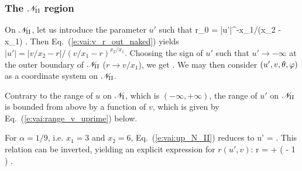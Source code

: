 \subsubsection{The $\mathscr{N}_{\rm II}$ region}

On $\mathscr{N}_{\rm II}$, let us introduce the parameter $u'$ such that
\be \label{e:vai:def_up_tilde_c}
    r_0 = |u'|^{-x_1/(x_2 - x_1)} .
\ee
Then Eq.~(\ref{e:vai:v_r_out_naked}) yields $|u'| = |v/x_2 - r| / (v/x_1 - r)^{x_2/x_1}$.
Choosing the sign of $u'$ such that $u'\to -\infty$ at the outer boundary of
$\mathscr{N}_{\rm II}$ ($r\to v/x_1$), we get
\be \label{e:vai:up_N_II}
    .
\ee
We may then consider $(u',v,\theta,\varphi)$ as a coordinate system on $\mathscr{N}_{\rm II}$.

\begin{remark}
Contrary to the range of $u$ on $\mathscr{N}_{\rm I}$, which is $(-\infty,+\infty)$,
the range of $u'$ on $\mathscr{N}_{\rm II}$ is bounded from above by a function
of $v$, which is given by Eq.~(\ref{e:vai:range_v_uprime}) below.
\end{remark}

\begin{example}
For $\alpha=1/9$, i.e. $x_1 = 3$ and $x_2 = 6$,
Eq.~(\ref{e:vai:up_N_II}) reduces to
\be \label{e:vai:up_v_r_alp1o9}
    u' =  .
\ee
This relation can be inverted, yielding  an explicit expression for $r(u', v)$:
\be \label{e:vai:r_up_v_alp1o9}
    r =  +  \left(  - 1 \right) .
\ee
\end{example}

